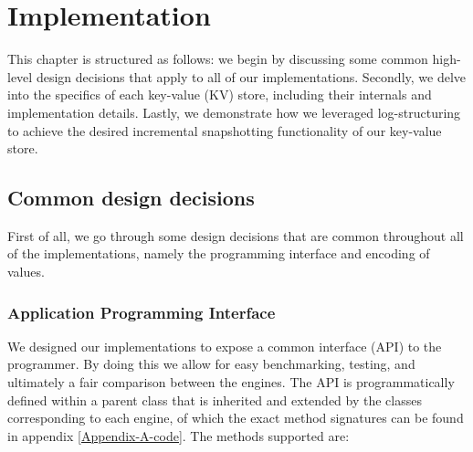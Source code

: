 
\chapter{Implementation}

\label{Chapter3-implementation}

This chapter is structured as follows: we begin by discussing some common high-level design decisions that apply to all of our implementations.
Secondly, we delve into the specifics of each key-value (KV) store, including their internals and implementation details.
Lastly, we demonstrate how we leveraged log-structuring to achieve the desired incremental snapshotting functionality of our key-value store.

\section{Common design decisions}

First of all, we go through some design decisions that are common throughout all of the implementations, namely the programming interface and encoding of values.

\subsection{Application Programming Interface}
\label{api}

We designed our implementations to expose a common interface (API) to the programmer.
By doing this we allow for easy benchmarking, testing, and ultimately a fair comparison between the engines.
The API is programmatically defined within a parent class that is inherited and extended by the classes corresponding to each engine, of which the exact method signatures can be found in appendix \ref{Appendix-A-code}.
The methods supported are:

